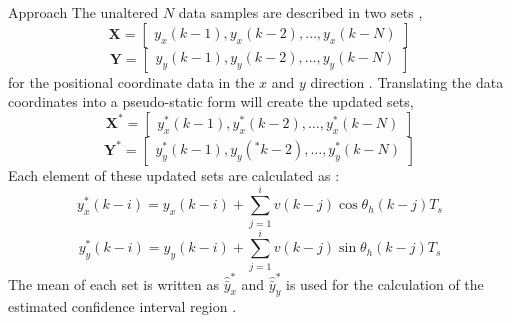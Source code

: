 \begin{section}{Approach}
The unaltered $N$ data samples are described in two sets ,
\begin{equation}
    \mathcal{\bm{X}}=\begin{bmatrix} y_x(k-1) ,y_x(k-2),\dots,y_x(k-N) \end{bmatrix} \nonumber
\end{equation}
\begin{equation}
    \mathcal{\bm{Y}}=\begin{bmatrix} y_y(k-1) ,y_y(k-2),\dots,y_y(k-N) \end{bmatrix} \nonumber
\end{equation}
for the positional coordinate data in the $x$ and $y$ direction . Translating the data coordinates into a pseudo-static form will create the updated sets,
\begin{equation}
    \mathcal{\bm{X}}^*=\begin{bmatrix} y_x^*(k-1) ,y_x^*(k-2),\dots,y_x^*(k-N) \end{bmatrix} \nonumber
\end{equation}
\begin{equation}
    \mathcal{\bm{Y}}^*=\begin{bmatrix} y_y^*(k-1) ,y_y(^*k-2),\dots,y_y^*(k-N) \end{bmatrix} \nonumber
\end{equation}
Each element of these updated sets are calculated as :
    \begin{equation}
	y_x^*(k-i) = y_x(k-i)+\sum_{j=1}^i v(k-j)\cos{\theta_h(k-j)T_s}
	\end{equation}
	\begin{equation}
	y_y^*(k-i) = y_y(k-i)+\sum_{j=1}^i v(k-j)\sin{\theta_h(k-j)T_s}
	\end{equation}
The mean of each set is written as $\hat{\bar{y}}_x^*$ and $\hat{\bar{y}}_y^*$ is used for the calculation of the estimated confidence interval region .


\end{section}
